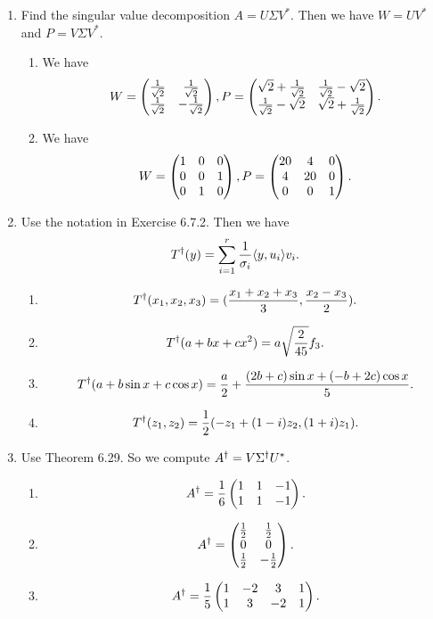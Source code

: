 \begin{enumerate}
\begin{enumerate}
\end{enumerate}
\item Find the singular value decomposition $A=U\Sigma V^*$. Then we have $W=UV^*$ and $P=V\Sigma V^*$.
\begin{enumerate}
\item We have 
\[W=\begin{pmatrix}\frac{1}{\sqrt{2}} & \frac{1}{\sqrt{2}}\cr \frac{1}{\sqrt{2}} & -\frac{1}{\sqrt{2}}\end{pmatrix},P=\begin{pmatrix}\sqrt{2}+\frac{1}{\sqrt{2}} & \frac{1}{\sqrt{2}}-\sqrt{2}\cr \frac{1}{\sqrt{2}}-\sqrt{2} & \sqrt{2}+\frac{1}{\sqrt{2}}\end{pmatrix}.\]
\item We have 
\[W=\begin{pmatrix}1 & 0 & 0\cr 0 & 0 & 1\cr 0 & 1 & 0\end{pmatrix},P=\begin{pmatrix}20 & 4 & 0\cr 4 & 20 & 0\cr 0 & 0 & 1\end{pmatrix}.\]
\end{enumerate}
\item Use the notation in Exercise 6.7.2. Then we have 
\[T^{\dagger}(y)=\sum_{i=1}^r{\frac{1}{\sigma_i}\langle y,u_i\rangle v_i}.\]
\begin{enumerate}
\item 
\[T^{\dagger}(x_1,x_2,x_3)=(\frac{x_1+x_2+x_3}{3},\frac{x_2-x_3}{2}).\]
\item 
\[T^{\dagger}(a+bx+cx^2)=a\sqrt{\frac{2}{45}}f_3.\]
\item 
\[T^{\dagger}(a+b\sin x+c\cos x)=\frac{a}{2}+\frac{(2b+c)\sin x+(-b+2c)\cos x}{5}.\]
\item 
\[T^{\dagger}(z_1,z_2)=\frac{1}{2}(-z_1+(1-i)z_2,(1+i)z_1).\]
\end{enumerate}
\item Use Theorem 6.29. So we compute $A^{\dagger}=V\Sigma ^{\dagger} U^*$.
\begin{enumerate}
\item 
\[A^{\dagger}=\frac{1}{6}\begin{pmatrix}1& 1 & -1\cr 1 & 1 & -1\end{pmatrix}.\]
\item 
\[A^{\dagger}=\begin{pmatrix}\frac{1}{2} & \frac{1}{2}\cr 0 & 0\cr \frac{1}{2} & -\frac{1}{2}\end{pmatrix}.\]
\item 
\[A^{\dagger}=\frac{1}{5}\begin{pmatrix}1&-2&3&1\\1&3&-2&1\end{pmatrix}.\]

\end{enumerate}
\end{enumerate}
